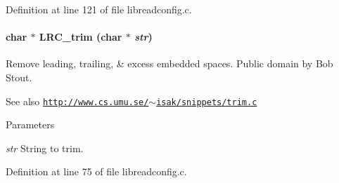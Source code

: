 Definition at line 121 of file libreadconfig.c.\hypertarget{group___l_r_c__internals_ga01c101649d6e132e1098711f84023ce7}{
\paragraph[{LRC\_\-trim}]{\setlength{\rightskip}{0pt plus 5cm}char $\ast$ LRC\_\-trim (char $\ast$ {\em str})}\hfill}
\label{group___l_r_c__internals_ga01c101649d6e132e1098711f84023ce7}


Remove leading, trailing, \& excess embedded spaces. Public domain by Bob Stout. \begin{DoxySeeAlso}{See also}
\href{http://www.cs.umu.se/~isak/snippets/trim.c}{\tt http://www.cs.umu.se/$\sim$isak/snippets/trim.c}
\end{DoxySeeAlso}

\begin{DoxyParams}{Parameters}
\item[{\em str}]String to trim. \end{DoxyParams}


Definition at line 75 of file libreadconfig.c.